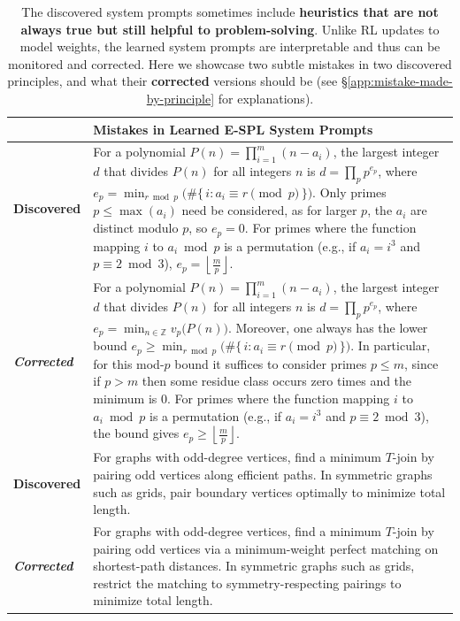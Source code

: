 \documentclass{article}
\theoremstyle{plain}
\theoremstyle{definition}
\theoremstyle{remark}
\begin{document}
\begin{table}[t]
\begin{tabular}{%
  p{}|
  >{\raggedright\arraybackslash\renewcommand{\baselinestretch}{1.15}\selectfont}p{}
}
\toprule
\textbf{} & \textbf{Mistakes in Learned E-SPL System Prompts} \\
\midrule
\textbf{Discovered}
&
For a polynomial $P(n) = {\textstyle\prod}_{i=1}^m (n - a_i)$, the largest integer $d$ that divides $P(n)$ for all integers $n$ is $d = {\textstyle\prod}_{p} p^{e_p}$, {\color{Brown} where
$e_p = \min_{r \bmod p} \bigl(\#\{\, i : a_i \equiv r \!\!\pmod p \,\}\bigr).$
Only primes $p \le \max(a_i)$ need be considered, as for larger $p$, the $a_i$ are distinct modulo $p$, so $e_p = 0$.}
For primes where the function mapping $i$ to $a_i \bmod p$ is a permutation (e.g., if $a_i = i^3$ and $p \equiv 2 \bmod 3$), {\color{Brown}$e_p = {{\left\lfloor \frac{m}{p} \right\rfloor}}$.
} \\
\midrule
\textit{\textbf{Corrected}} 
&
For a polynomial $P(n) = \prod_{i=1}^m (n - a_i)$, the largest integer $d$ that divides $P(n)$ for all integers $n$ is $d = \prod_{p} p^{e_p}$, {\color{MidnightBlue} where $e_p = \min_{n \in \mathbb{Z}} v_p\!\bigl(P(n)\bigr).$ Moreover, one always has the lower bound $e_p \ge \min_{r \bmod p} \bigl(\#\{\, i : a_i \equiv r \!\!\pmod p \,\}\bigr).$ In particular, for this mod-$p$ bound it suffices to consider primes $p \le m$, since if $p>m$ then some residue class occurs zero times and the minimum is $0$.} 
For primes where the function mapping $i$ to $a_i \bmod p$ is a permutation (e.g., if $a_i = i^3$ and $p \equiv 2 \bmod 3$), the bound gives {\color{MidnightBlue}$e_p \boldsymbol{\ge} \left\lfloor \frac{m}{p} \right\rfloor.$
} \\
\midrule
\textbf{Discovered}
&
For graphs with odd-degree vertices, find a minimum \(T\)-join by {\color{Brown}pairing odd vertices along efficient paths}. In symmetric graphs such as grids, {\color{Brown}pair boundary vertices} optimally to minimize total length.
\\
\midrule
\textit{\textbf{Corrected}} 
&
For graphs with odd-degree vertices, find a minimum $T$-join by {\color{MidnightBlue}pairing odd vertices via a minimum-weight perfect matching on shortest-path distances}. In symmetric graphs such as grids, {\color{MidnightBlue}restrict the matching to symmetry-respecting pairings} to minimize total length.
\\
\bottomrule
\end{tabular}
\vspace{0pt}
\caption{
The discovered system prompts sometimes include \textbf{heuristics that are {\color{Brown}not always true} but still helpful to problem-solving}. Unlike RL updates to model weights, the learned system prompts are interpretable and thus can be monitored and corrected. Here we showcase two subtle mistakes in two discovered principles, and what their {\color{MidnightBlue}\textbf{corrected}} versions should be (see \S\ref{app:mistake-made-by-principle} for explanations).}
\vspace{-14pt}
\label{tab:corrected-principles}
\end{table}
\end{document}
